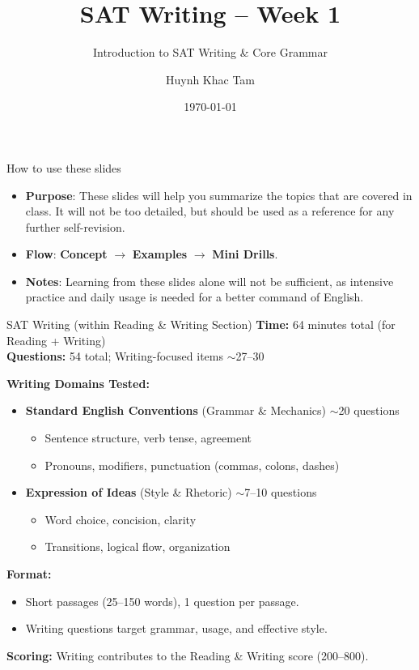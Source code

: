 \documentclass[aspectratio=169,11pt]{beamer}
\title{SAT Writing -- Week 1}
\subtitle{Introduction to SAT Writing \& Core Grammar}
\author{Huynh Khac Tam}
\date{\today}
\begin{document}
\begin{frame}
  \titlepage
\end{frame}

\begin{frame}{How to use these slides}
  \begin{itemize}
    \item \textbf{Purpose}: These slides will help you summarize the topics that are covered in class. It will not be too detailed, but should be used as a reference for any further self-revision.
    \item \textbf{Flow}: \textbf{Concept} $\rightarrow$ \textbf{Examples} $\rightarrow$ \textbf{Mini Drills}.
    \item \textbf{Notes}: Learning from these slides alone will not be sufficient, as intensive practice and daily usage is needed for a better command of English.
  \end{itemize}
\end{frame}

\begin{frame}{SAT Writing (within Reading \& Writing Section)}
\small
\textbf{Time:} 64 minutes total (for Reading + Writing) \\
\textbf{Questions:} 54 total; Writing-focused items $\sim$27--30

\vspace{0.6em}
\textbf{Writing Domains Tested:}
\begin{itemize}
  \item \textbf{Standard English Conventions} (Grammar \& Mechanics) $\sim$20 questions
    \begin{itemize}
      \item Sentence structure, verb tense, agreement
      \item Pronouns, modifiers, punctuation (commas, colons, dashes)
    \end{itemize}
    
  \item \textbf{Expression of Ideas} (Style \& Rhetoric) $\sim$7--10 questions
    \begin{itemize}
      \item Word choice, concision, clarity
      \item Transitions, logical flow, organization
    \end{itemize}
    
\end{itemize}

\vspace{0.6em}
\textbf{Format:}
\begin{itemize}
  \item Short passages (25--150 words), 1 question per passage.
  \item Writing questions target grammar, usage, and effective style.
\end{itemize}

\vspace{0.6em}
\textbf{Scoring:} Writing contributes to the Reading \& Writing score (200--800).
\end{frame}
\end{document}
